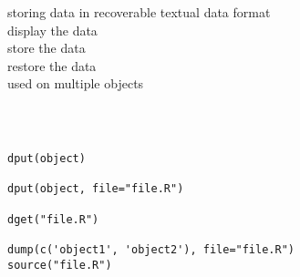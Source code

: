 \documentclass[12pt,a4paper]{report}
\begin{document}
\begin{tcolorbox}[colback=pageyl,colframe=pagebl,title= R \hfill Textual Data dput dget dump,coltitle=Magenta,fonttitle=\bfseries,coltext=Black,width=0.9\paperwidth,boxrule=2mm]\colorbox{pageyl}{\noindent\begin{minipage}[t]{0.3\textwidth}\sffamily \color{ctnb}\vspace{\baselineskip}
storing data in recoverable textual data format\\[\baselineskip]
display the data\\[\baselineskip]
store the data\\[\baselineskip]
restore the data\\[\baselineskip]
used on multiple objects
\end{minipage}}\qquad\begin{minipage}[t]{0.672\textwidth}
{\begin{lstlisting}[frame=single,framerule=0pt, numbers=none, numbersep=10pt, aboveskip=20pt,belowskip=20pt]



dput(object)

dput(object, file="file.R")

dget("file.R")

dump(c('object1', 'object2'), file="file.R")
source("file.R")
\end{lstlisting}}\end{minipage}\end{tcolorbox}
\end{document}
